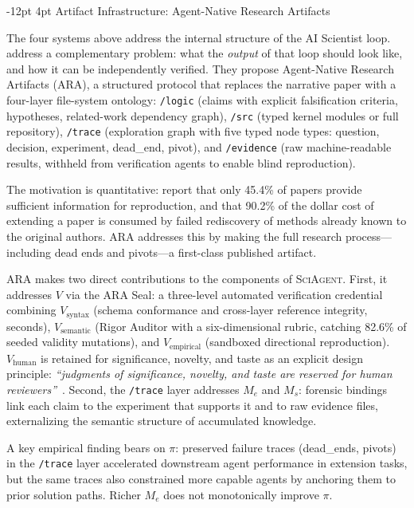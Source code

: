 \documentclass[11pt]{article}
\makeatletter
\renewcommand\subsection{\@startsection{subsection}{2}{\z@}%
  {-12pt \@plus -2pt \@minus -2pt}%
  {4pt \@plus 1pt}%
  {\normalfont\normalsize\bfseries}}
\newcommand{\framework}{\textsc{SciAgent}}
\makeatother
\begin{document}
\subsection{Artifact Infrastructure: Agent-Native Research Artifacts}
\label{sec:ara}

The four systems above address the internal structure of the AI Scientist loop. \citet{liu2026lasthuman} address a complementary problem: what the \emph{output} of that loop should look like, and how it can be independently verified. They propose Agent-Native Research Artifacts (ARA), a structured protocol that replaces the narrative paper with a four-layer file-system ontology: \texttt{/logic} (claims with explicit falsification criteria, hypotheses, related-work dependency graph), \texttt{/src} (typed kernel modules or full repository), \texttt{/trace} (exploration graph with five typed node types: question, decision, experiment, dead\_end, pivot), and \texttt{/evidence} (raw machine-readable results, withheld from verification agents to enable blind reproduction).

The motivation is quantitative: \citet{liu2026lasthuman} report that only 45.4\% of papers provide sufficient information for reproduction, and that 90.2\% of the dollar cost of extending a paper is consumed by failed rediscovery of methods already known to the original authors. ARA addresses this by making the full research process---including dead ends and pivots---a first-class published artifact.

ARA makes two direct contributions to the components of \framework{}. First, it addresses $V$ via the ARA Seal: a three-level automated verification credential combining $V_\text{syntax}$ (schema conformance and cross-layer reference integrity, seconds), $V_\text{semantic}$ (Rigor Auditor with a six-dimensional rubric, catching 82.6\% of seeded validity mutations), and $V_\text{empirical}$ (sandboxed directional reproduction). $V_\text{human}$ is retained for significance, novelty, and taste as an explicit design principle: \textit{``judgments of significance, novelty, and taste are reserved for human reviewers''}~\citep{liu2026lasthuman}. Second, the \texttt{/trace} layer addresses $M_e$ and $M_s$: forensic bindings link each claim to the experiment that supports it and to raw evidence files, externalizing the semantic structure of accumulated knowledge.

A key empirical finding bears on $\pi$: preserved failure traces (dead\_ends, pivots) in the \texttt{/trace} layer accelerated downstream agent performance in extension tasks, but the same traces also constrained more capable agents by anchoring them to prior solution paths. Richer $M_e$ does not monotonically improve $\pi$.
\end{document}
